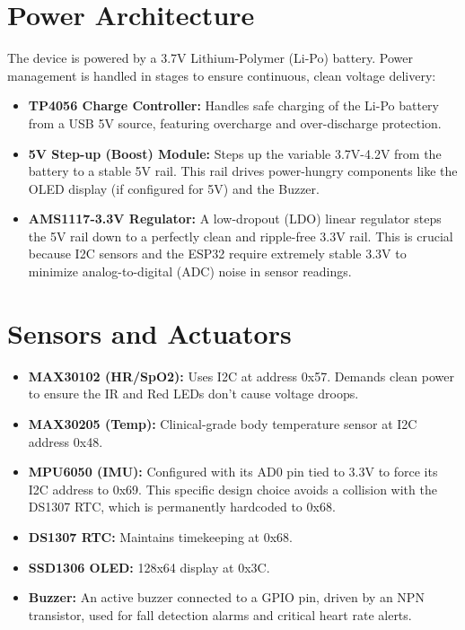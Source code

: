 \documentclass[12pt,a4paper]{report}
\begin{document}
\section{Power Architecture}
The device is powered by a 3.7V Lithium-Polymer (Li-Po) battery. Power management is handled in stages to ensure continuous, clean voltage delivery:
\begin{itemize}
    \item \textbf{TP4056 Charge Controller:} Handles safe charging of the Li-Po battery from a USB 5V source, featuring overcharge and over-discharge protection.
    \item \textbf{5V Step-up (Boost) Module:} Steps up the variable 3.7V-4.2V from the battery to a stable 5V rail. This rail drives power-hungry components like the OLED display (if configured for 5V) and the Buzzer.
    \item \textbf{AMS1117-3.3V Regulator:} A low-dropout (LDO) linear regulator steps the 5V rail down to a perfectly clean and ripple-free 3.3V rail. This is crucial because I2C sensors and the ESP32 require extremely stable 3.3V to minimize analog-to-digital (ADC) noise in sensor readings.
\end{itemize}

\section{Sensors and Actuators}
\begin{itemize}
    \item \textbf{MAX30102 (HR/SpO2):} Uses I2C at address 0x57. Demands clean power to ensure the IR and Red LEDs don't cause voltage droops.
    \item \textbf{MAX30205 (Temp):} Clinical-grade body temperature sensor at I2C address 0x48.
    \item \textbf{MPU6050 (IMU):} Configured with its AD0 pin tied to 3.3V to force its I2C address to 0x69. This specific design choice avoids a collision with the DS1307 RTC, which is permanently hardcoded to 0x68.
    \item \textbf{DS1307 RTC:} Maintains timekeeping at 0x68.
    \item \textbf{SSD1306 OLED:} 128x64 display at 0x3C.
    \item \textbf{Buzzer:} An active buzzer connected to a GPIO pin, driven by an NPN transistor, used for fall detection alarms and critical heart rate alerts.
\end{itemize}
\end{document}
